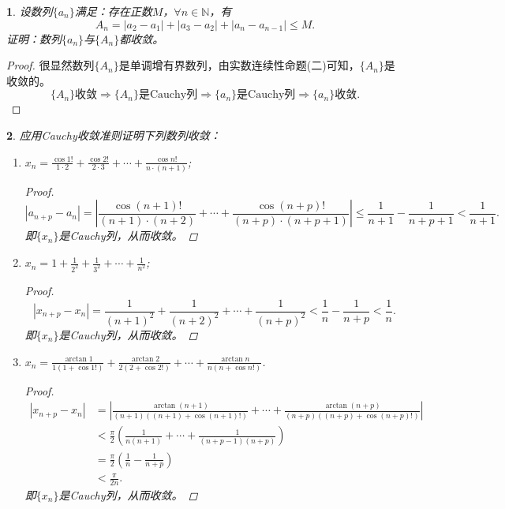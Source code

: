 \documentclass[utf8]{book}
\newtheorem{example}{}[section]             %
\begin{document}
\begin{example}
设数列$\{a_n\}$满足：存在正数$M$，$\forall n\in\mathbb{N}$，有$$A_n = \left|a_2-a_1 \right| +\left|a_3-a_2 \right| + \left|a_n-a_{n-1} \right| \leq M.$$
证明：数列$\{a_n\}$与$\{A_n\}$都收敛。
\end{example}
\begin{proof}
很显然数列$\{A_n\}$是单调增有界数列，由实数连续性命题(二)可知，$\{A_n\}$是收敛的。
$$\{A_n\}\text{收敛}\Rightarrow \{A_n\}\text{是Cauchy列}\Rightarrow \{a_n\}\text{是Cauchy列} \Rightarrow \{a_n\}\text{收敛}.$$
\end{proof}
\begin{example}
应用Cauchy收敛准则证明下列数列收敛：
\renewcommand\labelenumi{\normalfont(\theenumi)}
\begin{enumerate}
\item $\displaystyle x_n=\frac{\cos{1!}}{1\cdot 2}+\frac{\cos{2!}}{2\cdot 3}+\cdots+\frac{\cos{n!}}{n\cdot (n+1)}$;
\begin{proof}
$$\left|a_{n+p} - a_{n}\right| = \left|\frac{\cos{(n+1)!}}{(n+1)\cdot (n+2)}+\cdots+\frac{\cos{(n+p)!}}{(n+p)\cdot (n+p+1)}\right|\leq 
\frac{1}{n+1} - \frac{1}{n+p+1} < \frac{1}{n+1}.$$
即$\{x_n\}$是Cauchy列，从而收敛。
\end{proof}
\item $\displaystyle x_n=1+\frac{1}{2^2}+\frac{1}{3^2}+\cdots+\frac{1}{n^2}$;
\begin{proof}
$$\left|x_{n+p}-x_n\right| = \frac{1}{(n+1)^2}+\frac{1}{(n+2)^2}+\cdots+\frac{1}{(n+p)^2}<\frac{1}{n}-\frac{1}{n+p}<
\frac{1}{n}.$$
即$\{x_n\}$是Cauchy列，从而收敛。
\end{proof}
\item $\displaystyle x_n = \frac{\arctan{1}}{1(1+\cos{1!})}+\frac{\arctan{2}}{2(2+\cos{2!})}+\cdots+\frac{\arctan{n}}{n(n+\cos{n!})}$.
\begin{proof}
\begin{equation*}
\begin{split}
\left|x_{n+p}-x_{n}\right| &= \left|\frac{\arctan{(n+1)}}{(n+1)((n+1)+\cos{(n+1)!})}+\cdots+\frac{\arctan{(n+p)}}{(n+p)((n+p)+\cos{(n+p)!})}\right| \\
&<\frac{\pi}{2}\left(\frac{1}{n(n+1)}+\cdots+\frac{1}{(n+p-1)(n+p)}\right)\\
&=\frac{\pi}{2}\left(\frac{1}{n}-\frac{1}{n+p}\right)\\
&<\frac{\pi}{2n}.
\end{split}
\end{equation*}
即$\{x_n\}$是Cauchy列，从而收敛。
\end{proof}
\end{enumerate}
\end{example}
\end{document}
